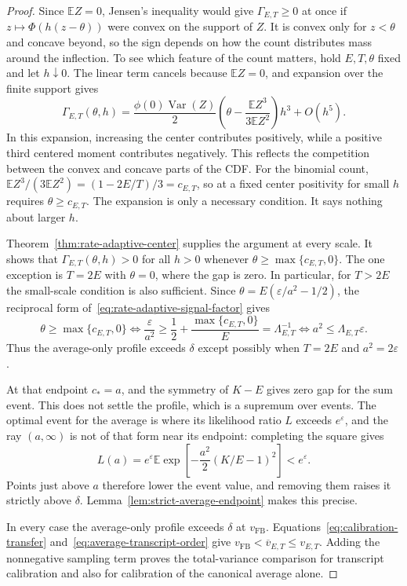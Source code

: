 \documentclass[11pt]{article}
\theoremstyle{remark}
\newcommand{\E}{\mathbb E}
\begin{document}
\begin{proof}
Since $\E Z=0$, Jensen's inequality would give $\Gamma_{E,T}\geq0$ at once
if $z\mapsto\Phi(h(z-\theta))$ were convex on the support of $Z$. It is
convex only for $z<\theta$ and concave beyond, so the sign depends on how the
count distributes mass around the inflection. To see which feature of the
count matters, hold $E,T,\theta$ fixed and let $h\downarrow0$. The linear term
cancels because $\E Z=0$, and expansion over the finite support gives
\begin{equation}\label{eq:gap-small-scale}
 \Gamma_{E,T}(\theta,h)
 =\frac{\phi(0)\operatorname{Var}(Z)}{2}
  \left(\theta-\frac{\E Z^3}{3\E Z^2}\right)h^3+O(h^5).
\end{equation}
In this expansion, increasing the center contributes positively, while a
positive third centered moment contributes negatively. This reflects the
competition between the convex and concave parts of the CDF. For the binomial count,
$\E Z^3/(3\E Z^2)=(1-2E/T)/3=c_{E,T}$, so at a fixed center positivity for
small $h$ requires $\theta\geq c_{E,T}$. The expansion is only a necessary
condition. It says nothing about larger $h$.

Theorem~\ref{thm:rate-adaptive-center} supplies the argument at every scale.
It shows that $\Gamma_{E,T}(\theta,h)>0$ for all $h>0$ whenever
$\theta\geq\max\{c_{E,T},0\}$. The one exception is $T=2E$ with $\theta=0$,
where the gap is zero. In particular, for $T>2E$ the small-scale condition is
also sufficient. Since $\theta=E(\varepsilon/a^2-1/2)$, the reciprocal form
of~\eqref{eq:rate-adaptive-signal-factor} gives
\[
 \theta\geq\max\{c_{E,T},0\}
 \iff\frac{\varepsilon}{a^2}\geq\frac12+\frac{\max\{c_{E,T},0\}}{E}
 =\Lambda_{E,T}^{-1}
 \iff a^2\leq\Lambda_{E,T}\varepsilon.
\]
Thus the average-only profile exceeds $\delta$ except possibly when $T=2E$ and
$a^2=2\varepsilon$.

At that endpoint $c_*=a$, and the symmetry of $K-E$ gives zero gap for the
sum event. This does not settle the profile, which is a supremum over events.
The optimal event for the average is where its likelihood ratio $L$ exceeds
$e^\varepsilon$, and the ray $(a,\infty)$ is not of that form near its
endpoint: completing the square gives
\[
 L(a)=e^\varepsilon\E\exp\!\left[
       -\frac{a^2}{2}(K/E-1)^2\right]<e^\varepsilon.
\]
Points just above $a$ therefore lower the event value, and removing them
raises it strictly above $\delta$. Lemma~\ref{lem:strict-average-endpoint}
makes this precise.

In every case the average-only profile exceeds $\delta$ at $v_{\mathrm{FB}}$.
Equations~\eqref{eq:calibration-transfer} and~\eqref{eq:average-transcript-order}
give $v_{\mathrm{FB}}<\overline v_{E,T}\leq v_{E,T}$. Adding the nonnegative
sampling term proves the total-variance comparison for transcript calibration
and also for calibration of the canonical average alone.
\end{proof}
\end{document}
